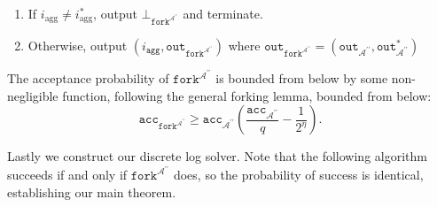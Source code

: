 \documentclass{mrl}
\theoremstyle{definition}
\numberwithin{theorem}{subsection}
\newcommand{\adversary}{\mathcal{A}}
\begin{document}
\begin{description}
\begin{enumerate}
\item If $i_{\text{agg}} \neq i_{\text{agg}}^*$, output $\bot_{\texttt{fork}^{\adversary^{\prime \prime}}}$ and terminate. 

\item Otherwise, output $(i_{\texttt{agg}}, \texttt{out}_{\texttt{fork}^{\adversary^{\prime \prime}}})$ where $\texttt{out}_{\texttt{fork}^{\adversary^{\prime \prime}}} = (\texttt{out}_{\adversary^{\prime \prime}}, \texttt{out}_{\adversary^{\prime \prime}}^*)$
\end{enumerate}

\end{description}


The acceptance probability of $\texttt{fork}^{\adversary^{\prime \prime}}$ is bounded from below by some non-negligible function, following the general forking lemma, bounded from below:
\[\texttt{acc}_{\texttt{fork}^{\adversary^{\prime \prime}}}
\geq  \texttt{acc}_{\adversary^{\prime\prime}} \left(\frac{\texttt{acc}_{\adversary^{\prime\prime}}}{q} - \frac{1}{2^\eta}\right).\]

Lastly we construct our discrete log solver. Note that the following algorithm succeeds if and only if $\texttt{fork}^{\adversary^{\prime \prime}}$ does, so the probability of success is identical, establishing our main theorem.
\end{document}
